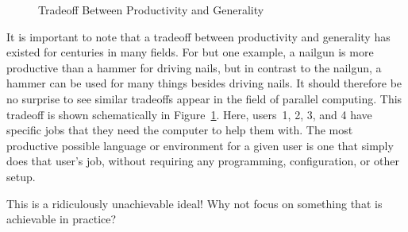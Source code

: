 \begin{figure}[tb]
\centering
{}
\caption{Tradeoff Between Productivity and Generality}
\label{fig:intro:Tradeoff Between Productivity and Generality}
\end{figure}

It is important to note that a tradeoff between productivity and
generality has existed for centuries in many fields.
For but one example, a nailgun is more productive than a hammer for
driving nails, but in contrast to the nailgun, a hammer can be used for
many things besides driving nails.
It should therefore be no surprise to see similar tradeoffs
appear in the field of parallel computing.
This tradeoff is shown schematically in
Figure~\ref{fig:intro:Tradeoff Between Productivity and Generality}.
Here, users~1, 2, 3, and 4 have specific jobs that they need the computer
to help them with.
The most productive possible language or environment for a given user is one
that simply does that user's job, without requiring any programming,
configuration, or other setup.

\QuickQuiz{}
	This is a ridiculously unachievable ideal!
	Why not focus on something that is achievable in practice?
 \QuickQuizEnd

